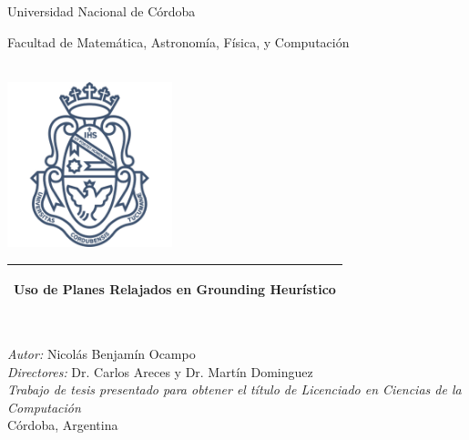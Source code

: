    
\frontmatter

\begin{titlepage}      
    \begin{center}
        {\huge
            Universidad Nacional de Córdoba
            
            \vspace{0.8cm}
            
            Facultad de Matemática, Astronomía, Física, y Computación
        }\\[1cm]
        \includegraphics[width=0.36\textwidth]{./figures/logo_unc.png}
        
        \vspace*{1cm}
        
        \begin{tabular}{@{}p{\textwidth}@{}}
        \toprule[2pt]
        \midrule
        \vspace{0.2cm}
        \begin{center}
        \Huge{\textbf{Uso de Planes Relajados en Grounding Heurístico}}
        \end{center}
        \vspace{0.2cm}\\
        \midrule
        \toprule[2pt]
        \end{tabular}

        \linespread{1}~\\[1cm]

        {\Large
            \emph{Autor:} Nicolás Benjamín Ocampo
        }\\[1cm]
        {\Large
            \emph{Directores:} Dr. Carlos Areces y Dr. Martín Dominguez
        }\\[1cm]

        
        \Large \emph{Trabajo de tesis presentado para obtener el título de
        Licenciado en Ciencias de la Computación}\\[0.3cm] 
        
        Córdoba, Argentina \hfill \frontpagetoday

        \doclicenseThis
    \end{center}
\end{titlepage}